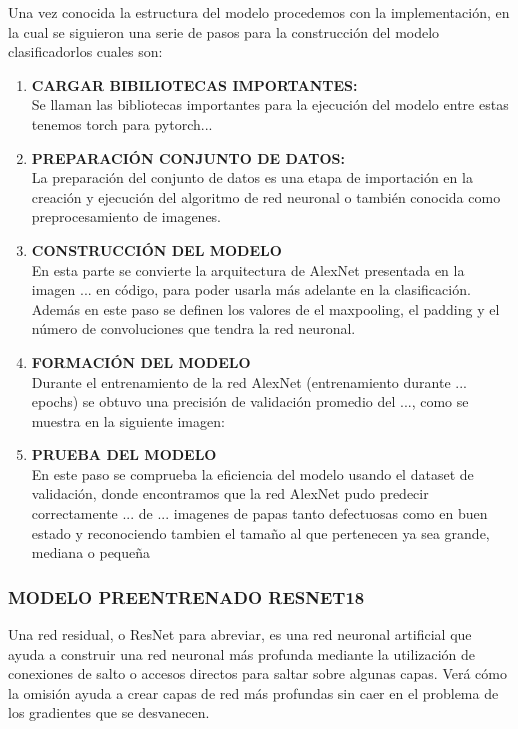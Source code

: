 			Una vez conocida la estructura del modelo procedemos con la implementación, en la cual se siguieron una serie de pasos para la construcción del modelo clasificadorlos cuales son:
			
			\begin{enumerate}
				\item \textbf{CARGAR BIBILIOTECAS IMPORTANTES:} 
				\\
				Se llaman las bibliotecas importantes para la ejecución del modelo entre estas tenemos torch para pytorch...
				\item \textbf{PREPARACIÓN CONJUNTO DE DATOS:} 
				\\
				La preparación del conjunto de datos es una etapa de importación en la creación y ejecución del algoritmo de red neuronal o también conocida como preprocesamiento de imagenes.
				\item\textbf{CONSTRUCCIÓN DEL MODELO}
				\\
				En esta parte se convierte la arquitectura de AlexNet presentada en la imagen ... en código, para poder usarla más adelante en la clasificación.
				Además en este paso se definen los valores de el maxpooling, el padding y el número de convoluciones que tendra la red neuronal.
				\item\textbf{FORMACIÓN DEL MODELO}
				\\
				Durante el entrenamiento de la red AlexNet (entrenamiento durante ... epochs) se obtuvo una precisión de validación promedio del ..., como se muestra en la siguiente imagen:
				\item \textbf{PRUEBA DEL MODELO}
				\\
				En este paso se comprueba la eficiencia del modelo usando el dataset de validación, donde encontramos que la red AlexNet pudo predecir correctamente ... de ... imagenes de papas tanto defectuosas como en buen estado y reconociendo tambien el tamaño al que pertenecen ya sea grande, mediana o pequeña 
			\end{enumerate} 
			
			\subsubsection{\MakeUppercase{Modelo preentrenado RESNET18}}
			Una red residual, o ResNet para abreviar, es una red neuronal artificial que ayuda a construir una red neuronal más profunda mediante la utilización de conexiones de salto o accesos directos para saltar sobre algunas capas. Verá cómo la omisión ayuda a crear capas de red más profundas sin caer en el problema de los gradientes que se desvanecen.
		
